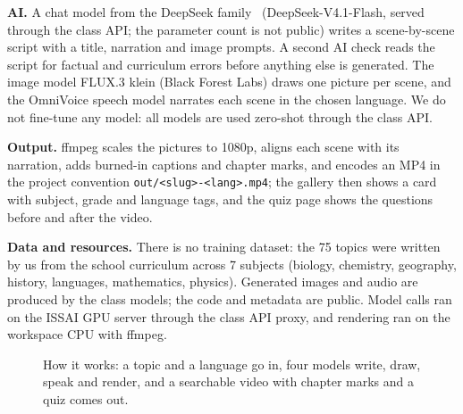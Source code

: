 \documentclass[10pt]{article}
\begin{document}
\textbf{AI.} A chat model from the DeepSeek family~\cite{deepseek2024} (DeepSeek-V4.1-Flash, served through the class API; the parameter count is not public) writes a scene-by-scene script with a title, narration and image prompts. A second AI check reads the script for factual and curriculum errors before anything else is generated. The image model FLUX.3 klein (Black Forest Labs) draws one picture per scene, and the OmniVoice speech model narrates each scene in the chosen language. We do not fine-tune any model: all models are used zero-shot through the class API.

\textbf{Output.} ffmpeg scales the pictures to 1080p, aligns each scene with its narration, adds burned-in captions and chapter marks, and encodes an MP4 in the project convention \texttt{out/<slug>-<lang>.mp4}; the gallery then shows a card with subject, grade and language tags, and the quiz page shows the questions before and after the video.

\textbf{Data and resources.} There is no training dataset: the 75 topics were written by us from the school curriculum across 7 subjects (biology, chemistry, geography, history, languages, mathematics, physics). Generated images and audio are produced by the class models; the code and metadata are public. Model calls ran on the ISSAI GPU server through the class API proxy, and rendering ran on the workspace CPU with ffmpeg.

\begin{figure}[t]
\centering
{}
\caption{How it works: a topic and a language go in, four models write, draw, speak and render, and a searchable video with chapter marks and a quiz comes out.}
\label{fig:pipeline}
\end{figure}
\end{document}
